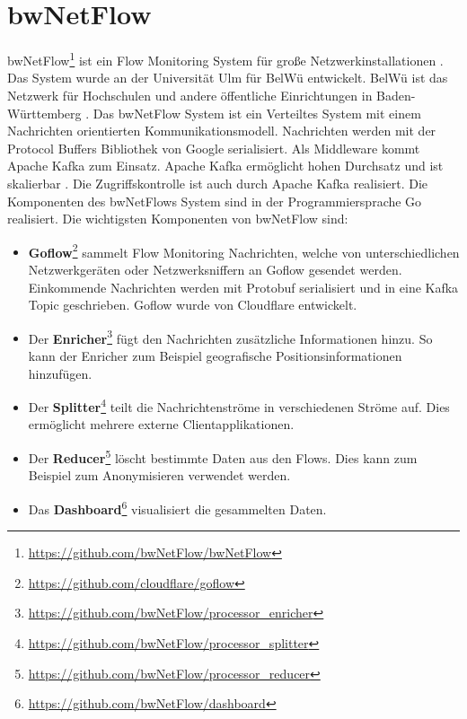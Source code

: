 \documentclass[a4paper, 12pt]{article}
\begin{document}
\section{bwNetFlow}
bwNetFlow\footnote{\url{https://github.com/bwNetFlow/bwNetFlow}} ist ein Flow Monitoring System für große Netzwerkinstallationen \cite{nagele2019bwnetflow}. Das System wurde an der Universität Ulm für BelWü entwickelt. BelWü ist das Netzwerk für Hochschulen und andere öffentliche Einrichtungen in Baden-Württemberg \cite{belwue}.
Das bwNetFlow System ist ein Verteiltes System mit einem Nachrichten orientierten Kommunikationsmodell.
Nachrichten werden mit der Protocol Buffers Bibliothek von Google serialisiert. Als Middleware kommt Apache Kafka zum Einsatz.
Apache Kafka ermöglicht hohen Durchsatz und ist skalierbar \cite{kafkaDoc}. 
Die Zugriffskontrolle ist auch durch Apache Kafka realisiert.
Die Komponenten des bwNetFlows System sind in der Programmiersprache Go realisiert.
Die wichtigsten Komponenten von bwNetFlow sind:
\begin{itemize}
\item \textbf{Goflow}\footnote{\url{https://github.com/cloudflare/goflow}} sammelt Flow Monitoring Nachrichten, welche von unterschiedlichen Netzwerkgeräten oder Netzwerksniffern an Goflow gesendet werden. Einkommende Nachrichten werden mit Protobuf serialisiert und in eine Kafka Topic geschrieben. Goflow wurde von Cloudflare entwickelt.
\item Der \textbf{Enricher}\footnote{\url{https://github.com/bwNetFlow/processor_enricher}} fügt den Nachrichten zusätzliche Informationen hinzu. So kann der Enricher zum Beispiel geografische Positionsinformationen hinzufügen.
\item Der \textbf{Splitter}\footnote{\url{https://github.com/bwNetFlow/processor_splitter}} teilt die Nachrichtenströme in verschiedenen Ströme auf. Dies ermöglicht mehrere externe Clientapplikationen.
\item Der \textbf{Reducer}\footnote{\url{https://github.com/bwNetFlow/processor_reducer}} löscht bestimmte Daten aus den Flows. Dies kann zum Beispiel zum Anonymisieren verwendet werden.
\item Das \textbf{Dashboard}\footnote{\url{https://github.com/bwNetFlow/dashboard}} visualisiert die gesammelten Daten.
\end{itemize}
\end{document}
